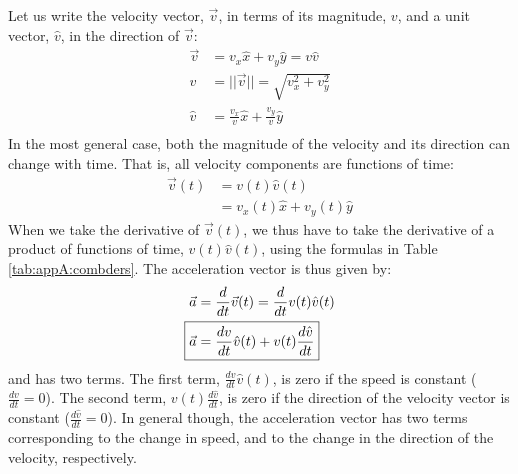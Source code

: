 Let us write the velocity vector, $\vec v$, in terms of its magnitude, $v$, and a unit vector, $\hat v$, in the direction of $\vec v$:
\begin{align*}
\vec v &=v_x\hat x+v_y\hat y= v \hat v\\
v&=||\vec v||=\sqrt{v_x^2+v_y^2}\\
\hat v &= \frac{v_x}{v}\hat x+\frac{v_y}{v}\hat y\\
\end{align*}
In the most general case, both the magnitude of the velocity and its direction can change with time. That is, all velocity components are functions of time:
\begin{align*}
\vec v(t)&=v(t)\hat v(t)\\
&=v_x(t)\hat x+v_y(t)\hat y
\end{align*}
When we take the derivative of $\vec v(t)$, we thus have to take the derivative of a product of functions of time, $v(t)\hat v(t)$, using the formulas in Table \ref{tab:appA:combders}. The acceleration vector is thus given by:
\begin{align}
\label{eqn:chap4:avecdef2}
\vec a &= \frac{d}{dt}\vec v(t)= \frac{d}{dt}v(t)\hat v(t)\nonumber\\
\Aboxed{\vec a&=\frac{dv}{dt}\hat v(t)+v(t)\frac{d\hat v}{dt}}
\end{align}
and has two terms. The first term, $\frac{dv}{dt}\hat v(t)$, is zero if the speed is constant ($\frac{dv}{dt}=0$). The second term, $v(t)\frac{d\hat v}{dt}$, is zero if the direction of the velocity vector is constant ($\frac{d\hat v}{dt}=0$). In general though, the acceleration vector has two terms corresponding to the change in speed, and to the change in the direction of the velocity, respectively.

